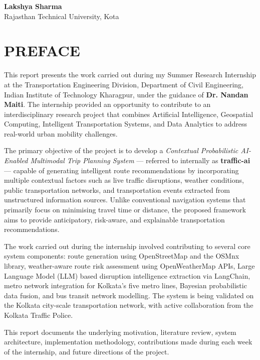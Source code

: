 \documentclass[12pt, a4paper]{report}
\begin{document}
\vspace{1.5cm}
\begin{flushright}
\Large \textbf{Lakshya Sharma} \\
\normalsize Rajasthan Technical University, Kota
\end{flushright}

\clearpage

\section*{PREFACE}

This report presents the work carried out during my Summer Research Internship at the Transportation Engineering Division, Department of Civil Engineering, Indian Institute of Technology Kharagpur, under the guidance of \textbf{Dr. Nandan Maiti}. The internship provided an opportunity to contribute to an interdisciplinary research project that combines Artificial Intelligence, Geospatial Computing, Intelligent Transportation Systems, and Data Analytics to address real-world urban mobility challenges.

The primary objective of the project is to develop a \textit{Contextual Probabilistic AI-Enabled Multimodal Trip Planning System} — referred to internally as \textbf{traffic-ai} — capable of generating intelligent route recommendations by incorporating multiple contextual factors such as live traffic disruptions, weather conditions, public transportation networks, and transportation events extracted from unstructured information sources. Unlike conventional navigation systems that primarily focus on minimising travel time or distance, the proposed framework aims to provide anticipatory, risk-aware, and explainable transportation recommendations.

The work carried out during the internship involved contributing to several core system components: route generation using OpenStreetMap and the OSMnx library, weather-aware route risk assessment using OpenWeatherMap APIs, Large Language Model (LLM) based disruption intelligence extraction via LangChain, metro network integration for Kolkata's five metro lines, Bayesian probabilistic data fusion, and bus transit network modelling. The system is being validated on the Kolkata city-scale transportation network, with active collaboration from the Kolkata Traffic Police.

This report documents the underlying motivation, literature review, system architecture, implementation methodology, contributions made during each week of the internship, and future directions of the project.
\end{document}
